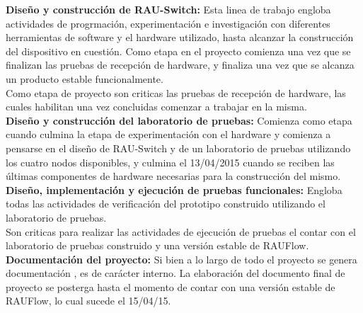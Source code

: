 \textbf{Diseño y construcci\'on de RAU-Switch:} Esta linea de trabajo engloba actividades de progrmaci\'on, experimentaci\'on e investigaci\'on con diferentes herramientas de software y el hardware utilizado, hasta alcanzar la construcci\'on del dispositivo en cuesti\'on. Como etapa en el proyecto comienza una vez que se finalizan las pruebas de recepci\'on de hardware, y finaliza una vez que se alcanza un producto estable funcionalmente.\\

Como etapa de proyecto son criticas las pruebas de recepci\'on de hardware, las cuales habilitan una vez concluidas comenzar a trabajar en la misma.\\

\textbf{Diseño y construcci\'on del laboratorio de pruebas:} Comienza como etapa cuando culmina la etapa de experimentaci\'on con el hardware y comienza a pensarse en el diseño de RAU-Switch y de un laboratorio de pruebas utilizando los cuatro nodos disponibles, y culmina el 13/04/2015 cuando se reciben las \'ultimas componentes de hardware necesarias para la construcci\'on del mismo.\\

\textbf{Diseño, implementaci\'on y ejecuci\'on de pruebas funcionales:} Engloba todas las actividades de verificaci\'on del prototipo construido utilizando el laboratorio de pruebas.\\

Son criticas para realizar las actividades de ejecuci\'on de pruebas el contar con el laboratorio de pruebas construido y una versi\'on estable de RAUFlow.\\

\textbf{Documentaci\'on del proyecto:} Si bien a lo largo de todo el proyecto se genera documentaci\'on  , es de carácter interno. La elaboraci\'on del documento final de proyecto se posterga hasta el momento de contar con una versi\'on estable de RAUFlow, lo cual sucede el 15/04/15.